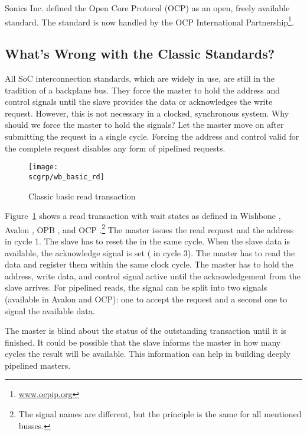 Sonics Inc. defined the Open Core Protocol (OCP) \cite{soc:ocp} as
an open, freely available standard. The standard is now handled by
the OCP International Partnership\footnote{\url{www.ocpip.org}}.




\subsection{What's Wrong with the Classic Standards?}

All SoC interconnection standards, which are widely in use, are still
in the tradition of a backplane bus. They force the master to hold
the address and control signals until the slave provides the data or
acknowledges the write request. However, this is not necessary in a
clocked, synchronous system. Why should we force the master to hold
the signals? Let the master move on after submitting the request in a
single cycle. Forcing the address and control valid for the complete
request disables any form of pipelined requests.


\begin{figure}
    \centering
    \texttt{[image: \\scgrp/wb\_basic\_rd]}
    \caption{Classic basic read transaction}
    \label{fig:wb:basic:rd}
\end{figure}

Figure~\ref{fig:wb:basic:rd} shows a read transaction with wait
states as defined in Wishbone \cite{soc:wishbone}, Avalon
\cite{soc:avalon}, OPB \cite{soc:opb}, and OCP
\cite{soc:ocp}.\footnote{The signal names are different, but the
principle is the same for all mentioned busses.} The master issues
the read request and the address in cycle 1. The slave has to reset
the  in the same cycle. When the slave data is available,
the acknowledge signal is set ( in cycle 3). The master has
to read the data and register them within the same clock cycle. The
master has to hold the address, write data, and control signal active
until the acknowledgement from the slave arrives. For pipelined
reads, the  signal can be split into two signals (available
in Avalon and OCP): one to accept the request and a second one to
signal the available data.

The master is blind about the status of the outstanding transaction
until it is finished. It could be possible that the slave informs the
master in how many cycles the result will be available. This
information can help in building deeply pipelined masters.

